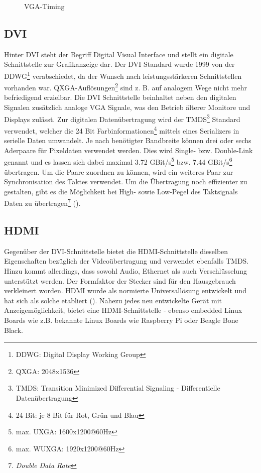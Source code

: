 \begin{figure}[htp]
	\centering
{}
	\caption{VGA-Timing}
	\label{fig:vga_timing}
\end{figure}

\subsection{DVI}
Hinter DVI steht der Begriff Digital Visual Interface und stellt ein digitale Schnittstelle zur Grafikanzeige dar. Der DVI Standard wurde 1999 von der DDWG\footnote{DDWG: Digital Display Working Group} verabschiedet, da der Wunsch nach leistungsstärkeren Schnittstellen vorhanden war. QXGA-Auflösungen\footnote{QXGA: 2048x1536} sind z. B. auf analogem Wege nicht mehr befriedigend erzielbar. Die DVI Schnittstelle beinhaltet neben den digitalen Signalen zusätzlich analoge VGA Signale, was den Betrieb älterer Monitore und Displays zulässt. Zur digitalen Datenübertragung wird der TMDS\footnote{TMDS: Transition Minimized Differential Signaling - Differentielle Datenübertragung} Standard verwendet, welcher die 24 Bit Farbinformationen\footnote{24 Bit: je 8 Bit für Rot, Grün und Blau} mittels eines Serializers in serielle Daten umwandelt. Je nach benötigter Bandbreite können drei oder sechs Aderpaare für Pixeldaten verwendet werden. Dies wird Single- bzw. Double-Link genannt und es lassen sich dabei maximal 3.72 GBit/s\footnote{max. UXGA: 1600x1200@60Hz} bzw. 7.44 GBit/s\footnote{max. WUXGA: 1920x1200@60Hz} übertragen. Um die Paare zuordnen zu können, wird ein weiteres Paar zur Synchronisation des Taktes verwendet. Um die Übertragung noch effizienter zu gestalten, gibt es die Möglichkeit bei High- sowie Low-Pegel des Taktsignals Daten zu übertragen\footnote{\textit{Double Data Rate}} (\cite{Leunig2002}).

\subsection{HDMI}
Gegenüber der DVI-Schnittstelle bietet die HDMI-Schnittstelle dieselben Eigenschaften bezüglich der Videoübertragung und verwendet ebenfalls TMDS. Hinzu kommt allerdings, dass sowohl Audio, Ethernet als auch Verschlüsselung unterstützt werden. Der Formfaktor der Stecker sind für den Hausgebrauch verkleinert worden. HDMI wurde als normierte Universallösung entwickelt und hat sich als solche etabliert (\cite{Extron2014}). Nahezu jedes neu entwickelte Gerät mit Anzeigemöglichkeit, bietet eine HDMI-Schnittstelle - ebenso embedded Linux Boards wie z.B. bekannte Linux Boards wie Raspberry Pi oder Beagle Bone Black.

